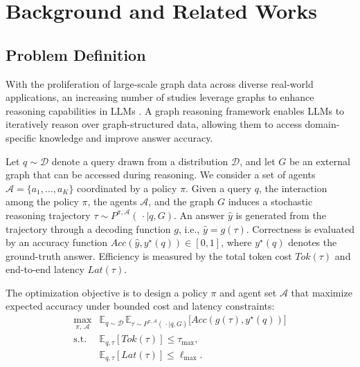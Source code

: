 \section{Background and Related Works}


\subsection{Problem Definition}

With the proliferation of large-scale graph data across diverse real-world applications, an increasing number of studies leverage graphs to enhance reasoning capabilities in LLMs \cite{wu2024can, cao2024graphreason, jin2024graph}.
A graph reasoning framework enables LLMs to iteratively reason over graph-structured data, allowing them to access domain-specific knowledge and improve answer accuracy.

\label{sec:problem-definition}
Let $q \sim \mathcal{D}$ denote a query drawn from a distribution $\mathcal{D}$, and let $G$ be an external graph that can be accessed during reasoning. 
We consider a set of agents $\mathcal{A}=\{a_1,\dots,a_K\}$ coordinated by a policy $\pi$. 
Given a query $q$, the interaction among the policy $\pi$, the agents $\mathcal{A}$, and the graph $G$ induces a stochastic reasoning trajectory
$\tau \sim P^{\pi,\mathcal{A}}(\,\cdot \mid q, G)$.
An answer $\hat{y}$ is generated from the trajectory through a decoding function $g$, i.e., $\hat{y}=g(\tau)$.
Correctness is evaluated by an accuracy function $Acc(\hat{y}, y^\star(q)) \in [0,1]$, where $y^\star(q)$ denotes the ground-truth answer.
Efficiency is measured by the total token cost $Tok(\tau)$ and end-to-end latency $Lat(\tau)$.

The optimization objective is to design a policy $\pi$ and agent set $\mathcal{A}$ that maximize expected accuracy under bounded cost and latency constraints:
\begin{equation}
\begin{array}{cl}
\max_{\pi,\,\mathcal{A}} 
& \mathbb{E}_{q \sim \mathcal{D}}\, \mathbb{E}_{\tau \sim P^{\pi,\mathcal{A}}(\,\cdot \mid q, G)} \big[ Acc(g(\tau), y^{\star}(q)) \big] \\[3pt]
\text{s.t.} 
& \mathbb{E}_{q, \tau}[Tok(\tau)] \leq \tau_{\max}, \\[2pt]
& \mathbb{E}_{q, \tau}[Lat(\tau)] \leq \ell_{\max}.
\end{array}
\end{equation}

